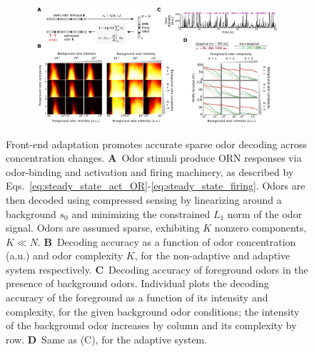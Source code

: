 \documentclass[9pt,twocolumn,twoside,lineno]{pnas-new}
\begin{document}
\begin{figure}[!tb]
	\centering
	\begin{subfigure}[t]{\linewidth}
		\includegraphics[width=\textwidth]{figures/3_decoding_temporal}
		\label{fig:decoding_a}
	\end{subfigure}
	\begin{subfigure}[t]{0\linewidth}
		\label{fig:decoding_b}
	\end{subfigure}
	\begin{subfigure}[t]{0\linewidth}
		\label{fig:decoding_c}
	\end{subfigure}
	\begin{subfigure}[t]{0\linewidth}
		\label{fig:decoding_d}
	\end{subfigure}
	\caption{\footnotesize{Front-end adaptation promotes accurate sparse odor decoding across concentration changes. 
			\textbf{A}~Odor stimuli produce ORN responses via odor-binding and activation and firing machinery, as described by Eqs.~\ref{eq:steady_state_act_OR}-\ref{eq:steady_state_firing}. Odors are then decoded using compressed sensing by linearizing around a background $s_0$ and minimizing the constrained $L_1$ norm of the odor signal.  Odors are assumed sparse, exhibiting $K$ nonzero components, $K \ll N$. 
			\textbf{B}~Decoding accuracy as a function of odor concentration (a.u.) and odor complexity $K$, for the non-adaptive and adaptive system respectively. 
			\textbf{C}~Decoding accuracy of foreground odors in the presence of background odors. Individual plots the decoding accuracy of the foreground as a function of its intensity and complexity, for the given background odor conditions; the intensity of the background odor increases by column and its complexity by row.
			\textbf{D}~Same as (C), for the adaptive system.}}
	\label{fig:decoding}
\end{figure}
\end{document}
